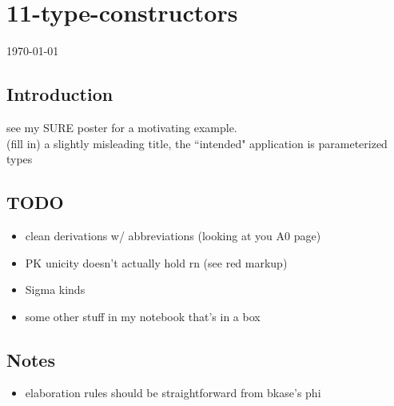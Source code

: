 \documentclass[12pt]{article}
\begin{document}
\section*{11-type-constructors}
\today
\subsection*{Introduction}
see my SURE poster for a motivating example. \\
(fill in) a slightly misleading title, the ``intended" application is parameterized types
\subsection*{TODO}
\begin{itemize}
    \item clean derivations w/ abbreviations (looking at you A0 page)
    \item PK unicity doesn't actually hold rn (see red markup)
    \item Sigma kinds
    \item some other stuff in my notebook that's in a box
\end{itemize}
\subsection*{Notes}
\begin{itemize}
    \item elaboration rules should be straightforward from bkase's phi
\end{itemize}
\end{document}
